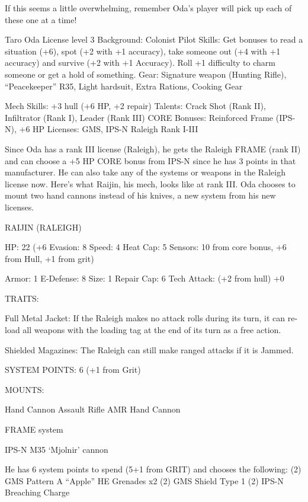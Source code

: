If this seems a little overwhelming, remember Oda’s player will pick up each of these one at a  
time!
 

                                                                                                                


Taro Oda 
License level 3 
Background: Colonist 
Pilot Skills: Get bonuses to read a situation (+6), spot (+2 with +1 accuracy), take someone out 
(+4 with +1 accuracy) and survive (+2 with +1 Accuracy). Roll +1 difficulty to charm someone or 
get a hold of something. 
Gear: Signature weapon (Hunting Rifle), “Peacekeeper” R35, Light hardsuit, Extra Rations, 
Cooking Gear 

Mech Skills: +3 hull (+6 HP, +2 repair) 
Talents: Crack Shot (Rank II), Infiltrator (Rank I), Leader (Rank III) 
CORE Bonuses: Reinforced Frame (IPS-N),  +6 HP 
Licenses: GMS, IPS-N Raleigh Rank I-III 

Since Oda has a rank III license (Raleigh), he gets the Raleigh FRAME (rank II) and can choose a 
+5 HP CORE bonus from IPS-N since he has 3 points in that manufacturer. He can also take any 
of the systems or weapons in the Raleigh license now. Here’s what Raijin, his mech, looks like at 
rank III. Oda chooses to mount two hand cannons instead of his knives, a new system from his 
new licenses. 

                                            RAIJIN (RALEIGH) 

 HP: 22 (+6      Evasion: 8                            Speed: 4            Heat Cap: 5        Sensors: 10 
 from core 
 bonus, +6 
 from Hull, 
 +1 from grit) 

 Armor: 1        E-Defense: 8                          Size: 1             Repair Cap: 6      Tech Attack:  
                                                                           (+2 from hull)     +0 

                                                    TRAITS: 

 Full Metal Jacket: If the Raleigh makes no attack rolls during its turn, it can re-load all weapons with  
 the loading tag at the end of its turn as a free action.
 
 Shielded Magazines: The Raleigh can still make ranged attacks if it is Jammed. 

                                     SYSTEM POINTS: 6 (+1 from Grit) 

                                                   MOUNTS: 

 Hand Cannon
                       Assault Rifle                           AMR 
 Hand Cannon 

                                                FRAME system 

                                                                                                               


                                          IPS-N M35 ‘Mjolnir’ cannon 

He has 6 system points to spend (5+1 from GRIT) and chooses the following:  
(2) GMS Pattern A “Apple” HE Grenades x2  
(2) GMS Shield Type 1  
(2) IPS-N Breaching Charge
 
